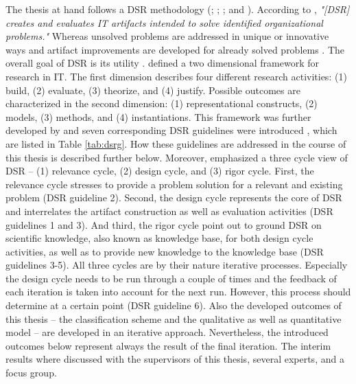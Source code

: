 The thesis at hand follows a \ac{DSR} methodology (\citealp{March1995}; \citealp{Hevner2004}; \citealp{Hevner2007}; and \citealp{Peffers2007}). According to \citet[p. 77]{Hevner2004}, \textit{"[\ac{DSR}] creates and evaluates IT artifacts intended to solve identified organizational problems."} Whereas unsolved problems are addressed in unique or innovative ways and artifact improvements are developed for already solved problems \citep[p. 81]{Hevner2004}. The overall goal of \ac{DSR} is its utility \citep[p. 80]{Hevner2004}.
\citet[pp. 255-262]{March1995} defined a two dimensional framework for research in \ac{IT}. The first dimension describes four different research activities: (1) build, (2) evaluate, (3) theorize, and (4) justify. Possible outcomes are characterized in the second dimension: (1) representational constructs, (2) models, (3) methods, and (4) instantiations. This framework was further developed by \citet[pp. 78-81]{Hevner2004} and seven corresponding \ac{DSR} guidelines were introduced \citep[pp. 82-90]{Hevner2004}, which are listed in Table \ref{tab:dsrg}. How these guidelines are addressed in the course of this thesis is described further below. Moreover, \citet[pp. 87-92]{Hevner2007} emphasized a three cycle view of \ac{DSR} -- (1) relevance cycle, (2) design cycle, and (3) rigor cycle. First, the relevance cycle stresses to provide a problem solution for a relevant and existing problem (\ac{DSR} guideline 2). Second, the design cycle represents the core of \ac{DSR} and interrelates the artifact construction as well as evaluation activities (\ac{DSR} guidelines 1 and 3). And third, the rigor cycle point out to ground \ac{DSR} on scientific knowledge, also known as knowledge base, for both design cycle activities, as well as to provide new knowledge to the knowledge base (\ac{DSR} guidelines 3-5). All three cycles are by their nature iterative processes. Especially the design cycle needs to be run through a couple of times and the feedback of each iteration is taken into account for the next run. However, this process should determine at a certain point (\ac{DSR} guideline 6). Also the developed outcomes of this thesis -- the classification scheme and the qualitative as well as quantitative model -- are developed in an iterative approach. Nevertheless, the introduced outcomes below represent always the result of the final iteration. The interim results where discussed with the supervisors of this thesis, several experts, and a focus group.

